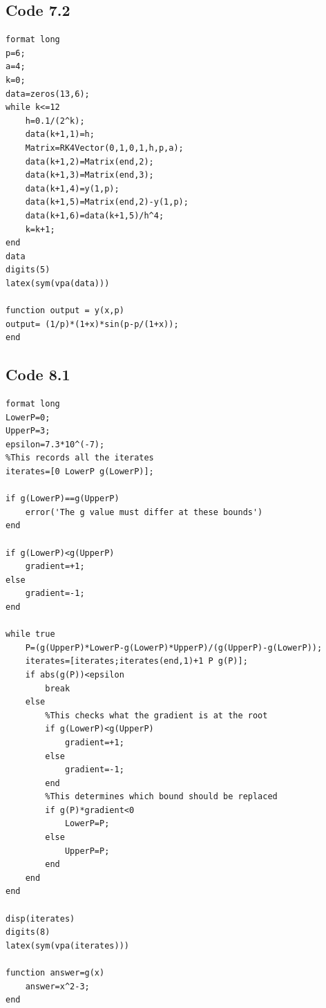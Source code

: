 \documentclass[10pt,a4paper,notitlepage]{article}
\begin{document}
\subsection*{\centering \normalsize Code 7.2}\label{subsec:Code 7.2}
\begin{verbatim}
format long
p=6;
a=4;
k=0;
data=zeros(13,6);
while k<=12
    h=0.1/(2^k);
    data(k+1,1)=h;
    Matrix=RK4Vector(0,1,0,1,h,p,a);
    data(k+1,2)=Matrix(end,2);
    data(k+1,3)=Matrix(end,3);
    data(k+1,4)=y(1,p);
    data(k+1,5)=Matrix(end,2)-y(1,p);
    data(k+1,6)=data(k+1,5)/h^4;
    k=k+1;
end
data
digits(5)
latex(sym(vpa(data)))

function output = y(x,p)
output= (1/p)*(1+x)*sin(p-p/(1+x));
end
\end{verbatim}
\pagebreak
\subsection*{\centering \normalsize Code 8.1}\label{subsec:Code 8.1}
\begin{verbatim}
format long
LowerP=0;
UpperP=3;
epsilon=7.3*10^(-7);
%This records all the iterates
iterates=[0 LowerP g(LowerP)];

if g(LowerP)==g(UpperP)
    error('The g value must differ at these bounds')
end

if g(LowerP)<g(UpperP)
    gradient=+1;
else
    gradient=-1;
end

while true
    P=(g(UpperP)*LowerP-g(LowerP)*UpperP)/(g(UpperP)-g(LowerP));
    iterates=[iterates;iterates(end,1)+1 P g(P)];
    if abs(g(P))<epsilon
        break
    else
        %This checks what the gradient is at the root
        if g(LowerP)<g(UpperP)
            gradient=+1;
        else
            gradient=-1;
        end
        %This determines which bound should be replaced
        if g(P)*gradient<0
            LowerP=P;
        else
            UpperP=P;
        end
    end
end

disp(iterates)
digits(8)
latex(sym(vpa(iterates)))

function answer=g(x)
    answer=x^2-3;
end
\end{verbatim}
\pagebreak
\end{document}

